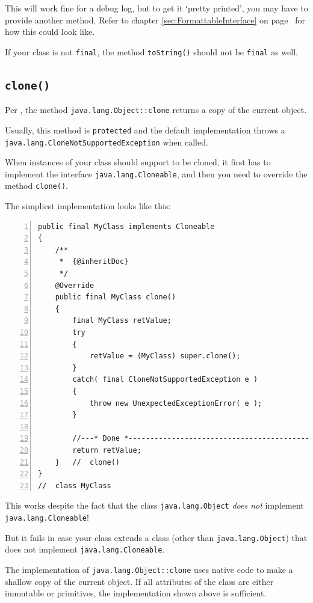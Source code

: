 \documentclass[11pt,a4paper, titlepage, parskip=half, headsepline, footsepline, cleardoublepage=current, headheight=1cm]{scrbook}
\newcommand*{\tqvref}[1]{\hyperref[{#1}]{\ref*{#1}} on page~\pageref{#1}}
\begin{document}
This will work fine for a debug log, but to get it ‘pretty printed’, you may have to provide another method. Refer to chapter \tqvref{sec:FormattableInterface} for how
this could look like.

If your class is not \lstinline|final|, the method \lstinline|toString()| should not be \lstinline|final| as well. 

\subsection{\lstinline|clone()|}\label{sec:Clone}
Per \autocite{ORACLE_DOC_OBJECT:clone}, the method \lstinline|java.lang.Object::clone| returns a copy of the current object.

Usually, this method is \lstinline|protected| and the default implementation throws a \lstinline|java.lang.CloneNotSupportedException|\autocite{ORACLE_DOC_CLONENOTSUPPORTEDEXCEPTION_CLASS} when called.

When instances of your class should support to be cloned, it first has to implement the interface \lstinline|java.lang.Cloneable|\autocite{ORACLE_DOC_CLONEABLE_INTERFACE}, and then you need to override the method \lstinline|clone()|.

The simpliest implementation looks like this:
\begin{lstlisting}[numbers=left,caption={A simple clone() Method}]
public final MyClass implements Cloneable
{
    /**
     *  {@inheritDoc}
     */
    @Override
    public final MyClass clone()
    {
        final MyClass retValue;
        try
        {
            retValue = (MyClass) super.clone();
        }    
        catch( final CloneNotSupportedException e )
        {
            throw new UnexpectedExceptionError( e );
        }
        
        //---* Done *------------------------------------------------
        return retValue;
    }   //  clone() 
}
//  class MyClass
\end{lstlisting}
This works despite the fact that the class \lstinline|java.lang.Object| \textit{does not} implement \lstinline|java.lang.Cloneable|!

But it fails in case your class extends a class (other than \lstinline|java.lang.Object|) that does not implement \lstinline|java.lang.Cloneable|.

The implementation of \lstinline|java.lang.Object::clone| uses native code to make a shallow copy of the current object. If all attributes of the class are either immutable or primitives, the implementation shown above is sufficient.
\end{document}
